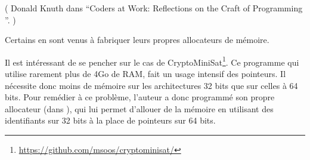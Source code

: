 ( Donald Knuth dans ``Coders at Work: Reflections on the Craft of Programming ''. )

Certains en sont venus à fabriquer leurs propres allocateurs de mémoire.

Il est intéressant de se pencher sur le cas de CryptoMiniSat\footnote{\url{https://github.com/msoos/cryptominisat/}}.
Ce programme qui utilise rarement plus de 4Go de \ac{RAM}, fait un usage intensif des pointeurs.
Il nécessite donc moins de mémoire sur les architectures 32 bits que sur celles à 64 bits.
Pour remédier à ce problème, l'auteur a donc programmé son propre allocateur 
(dans ), qui lui permet d'allouer de la mémoire en utilisant des 
identifiants sur 32 bits à la place de pointeurs sur 64 bits.

